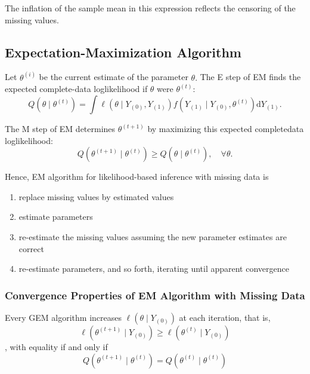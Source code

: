 \begin{example}
	The inflation of the sample mean in this expression reflects the censoring of the missing values.
\end{example}

\subsection{Expectation-Maximization Algorithm}

Let $\theta^{(i)}$ be the current estimate of the parameter $\theta .$ The E step of EM finds the expected complete-data loglikelihood if $\theta$ were $\theta^{(t)}$:
\begin{equation}
	Q\left(\theta \mid \theta^{(t)}\right)=\int\ell\left(\theta \mid Y_{(0)}, Y_{(1)}\right) f\left(Y_{(1)} \mid Y_{(0)}, \theta^{(t)}\right) \mathrm{d} Y_{(1)}.
\end{equation}

The M step of EM determines $\theta^{(t+1)}$ by maximizing this expected completedata loglikelihood:
\begin{equation}
	Q\left(\theta^{(t+1)} \mid \theta^{(t)}\right) \geq Q\left(\theta \mid \theta^{(t)}\right), \quad \forall\theta.
\end{equation}

Hence, EM algorithm for likelihood-based inference with missing data is
\begin{enumerate}
	\item replace missing values by estimated
	      values
	\item estimate parameters
	\item re-estimate the missing values assuming the new parameter estimates are correct
	\item re-estimate parameters, and so forth, iterating until apparent convergence
\end{enumerate}

\subsubsection{Convergence Properties of EM Algorithm with Missing Data}

\begin{theorem}
	Every GEM algorithm increases $\ell\left(\theta \mid Y_{(0)}\right)$ at each iteration, that is,
	\begin{equation}
		\ell\left(\theta^{(t+1)} \mid Y_{(0)}\right) \geq \ell\left(\theta^{(t)} \mid Y_{(0)}\right)
	\end{equation}
	, with equality if and only if
	\begin{equation}
		Q\left(\theta^{(t+1)} \mid \theta^{(t)}\right)=Q\left(\theta^{(t)} \mid \theta^{(t)}\right)
	\end{equation}
\end{theorem}

